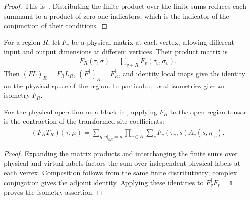 \begin{proof}\leanok
    This is~\cite[``Independent finite choices'']{QICLean2026Blueprint}.
    Distributing the finite product over the finite sums reduces each summand to a product of
    zero-one indicators, which is the indicator of the conjunction of their conditions.
\end{proof}

\begin{lemma}%
    \label{thm:peps_region_physical_maps}
    \leanok
    For a region $R$, let $F_v$ be a physical matrix at each vertex, allowing
    different input and output dimensions at different vertices. Their product
    matrix is
    \begin{align}
        F_R(\tau,\sigma)=\prod_{v\in R}F_v(\tau_v,\sigma_v).
    \end{align}
    Then $(FL)_R=F_RL_R$, $(F^\dagger)_R=F_R^\dagger$, and identity local maps
    give the identity on the physical space of the region. In particular,
    local isometries give an isometry $F_R$.

    For the physical operation on a block in
    \cite[\S6.1, accessible virtual coordinates]{Schuch2010PEPS}, applying $F_R$ to the open-region tensor is the contraction of the
    transformed site coefficients:
    \begin{align}
        (F_R T_R)(\tau,\mu)=
        \sum_{\eta:\eta|_{\partial R}=\mu}
        \prod_{v\in R}\sum_s F_v(\tau_v,s)A_v(s,\eta|_v).
    \end{align}
\end{lemma}
\begin{proof}\leanok
    Expanding the matrix products and interchanging the finite sums over physical
    and virtual labels factors the sum over independent physical labels at
    each vertex. Composition follows from the same finite distributivity;
    complex conjugation gives the adjoint identity. Applying these identities
    to $F_v^\dagger F_v=\mathbb 1$ proves the isometry assertion.
\end{proof}

